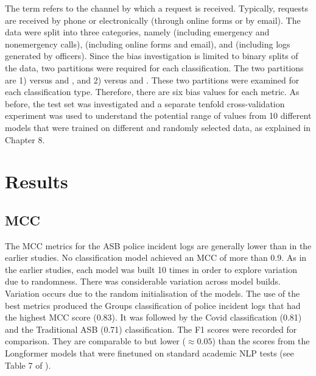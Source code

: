 The term refers to the channel by which a request is received. Typically, requests are received by phone or electronically (through online forms or by email). The data were split into three categories, namely  (including emergency and nonemergency calls),  (including online forms and email), and (including logs generated by officers). Since the bias investigation is limited to binary splits of the data, two partitions were required for each classification. The two partitions are 1)  versus  and , and 2)  versus  and . These two partitions were examined for each classification type. Therefore, there are six bias values for each metric. As before, the test set was investigated and a separate tenfold cross-validation experiment was used to understand the potential range of values from 10 different models that were trained on different and randomly selected data, as explained in Chapter 8.


\section{Results}

\subsection{MCC} The MCC metrics for the ASB police incident logs are generally lower than in the earlier studies. No classification model achieved an MCC of more than 0.9. As in the earlier studies, each model was built 10 times in order to explore variation due to randomness. There was considerable variation across model builds. Variation occurs due to the random initialisation of the models. The use of the best metrics produced the Groups classification of police incident logs that had the highest MCC score (0.83). It was followed by the Covid classification (0.81) and the Traditional ASB (0.71) classification. The F1 scores were recorded for comparison. They are comparable to but lower ($\approx 0.05$) than the scores from the Longformer models that were finetuned on standard academic NLP tests (see Table 7 of \textcite{beltagy2020longformer}). 

